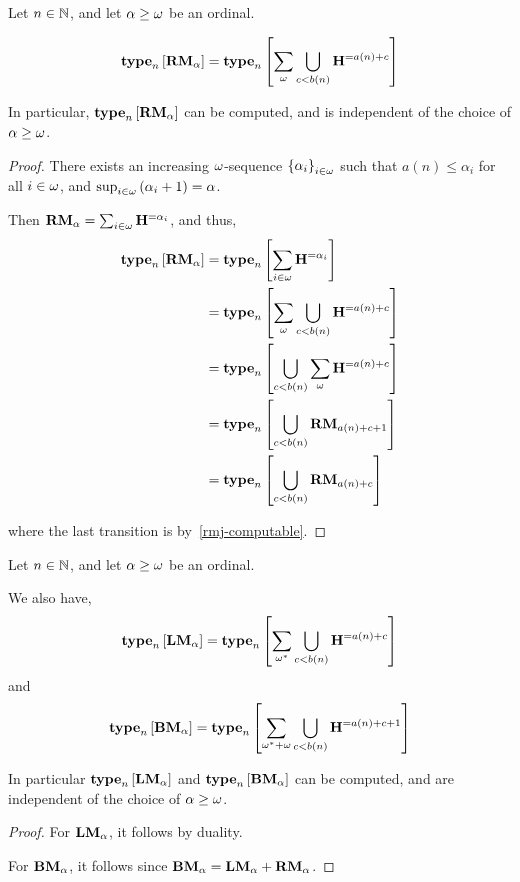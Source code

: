 \begin{lemma}
    Let $n \in \mathbb{N}$, and let $\alpha \ge \omega$ be an ordinal.

    \[
        \mathbf{type}_{n} \left[ {\mathbf{RM}_{\alpha}} \right]
        = \mathbf{type}_{n} \left[ {\sum_{\omega} {\bigcup_{c < b(n)}{\mathbf{H}_{}^{= a(n) + c}}}} \right]
    \]

    In particular, $\mathbf{type}_{n} \left[ {\mathbf{RM}_{\alpha}} \right]$ can be
    computed, and is independent of the choice of $\alpha \ge \omega$.
\end{lemma}

\begin{proof}
    There exists an increasing $\omega$-sequence $\left\{ {\alpha_i} \right\}_{i \in \omega}$ such that
    $a(n) \le \alpha_i$ for all $i \in \omega$,
    and $\sup_{i \in \omega} \left( {\alpha_i + 1} \right) = \alpha$.

    Then $\mathbf{RM}_{\alpha} = \sum_{i \in \omega} \mathbf{H}_{}^{= \alpha_i}$,
    and thus,
    \begin{align*}
        \mathbf{type}_{n} \left[ {\mathbf{RM}_{\alpha}} \right]
         & = \mathbf{type}_{n} \left[ {\sum_{i \in \omega} \mathbf{H}_{}^{= \alpha_i}} \right]               \\
         & = \mathbf{type}_{n} \left[ {\sum_{\omega} \bigcup_{c < b(n)}{\mathbf{H}_{}^{= a(n) + c}}} \right] \\
         & = \mathbf{type}_{n} \left[ {\bigcup_{c < b(n)}{\sum_{\omega} \mathbf{H}_{}^{= a(n) + c}}} \right] \\
         & = \mathbf{type}_{n} \left[ {\bigcup_{c < b(n)}{\mathbf{RM}_{a(n) + c + 1}}} \right]         \\
         & = \mathbf{type}_{n} \left[ {\bigcup_{c < b(n)}{\mathbf{RM}_{a(n) + c}}} \right]             \\
    \end{align*}

    where the last transition is by~\cref{rmj-computable}.
\end{proof}

\begin{corollary}
    Let $n \in \mathbb{N}$, and let $\alpha \ge \omega$ be an ordinal.

    We also have,
    \[
        \mathbf{type}_{n} \left[ {\mathbf{LM}_{\alpha}} \right] = \mathbf{type}_{n} \left[ {\sum_{\omega^\ast} \bigcup_{c < b(n)}{\mathbf{H}_{}^{= a(n) + c}}} \right]
    \]
    and
    \[
        \mathbf{type}_{n} \left[ {\mathbf{BM}_{\alpha}} \right] = \mathbf{type}_{n} \left[ {\sum_{\omega^\ast + \omega} \bigcup_{c < b(n)}{\mathbf{H}_{}^{= a(n) + c + 1}}} \right]
    \]

    In particular $\mathbf{type}_{n} \left[ {\mathbf{LM}_{\alpha}} \right]$ and $\mathbf{type}_{n} \left[ {\mathbf{BM}_{\alpha}} \right]$ can be computed,
    and are independent of the choice of $\alpha \ge \omega$.
\end{corollary}

\begin{proof}
    For $\mathbf{LM}_{\alpha}$, it follows by duality.

    For $\mathbf{BM}_{\alpha}$, it follows since $\mathbf{BM}_{\alpha} = \mathbf{LM}_{\alpha} + \mathbf{RM}_{\alpha}$.
\end{proof}
